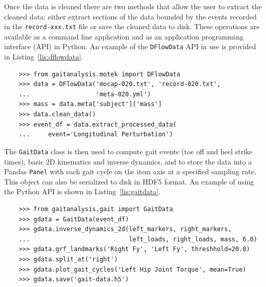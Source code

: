 \documentclass[fleqn,12pt]{wlpeerj}
\begin{document}
Once the data is cleaned there are two methods that allow the user to extract
the cleaned data: either extract sections of the data bounded by the events
recorded in the \verb|record-xxx.txt| file or save the cleaned data to disk.
These operations are available as a command line application and as an
application programming interface (API) in Python. An example of the
\verb|DFlowData| API in use is provided in Listing~\ref{lis:dflowdata}.
%
\begin{listing}
  \begin{verbatim}
    >>> from gaitanalysis.motek import DFlowData
    >>> data = DFlowData('mocap-020.txt', 'record-020.txt',
    ...                  'meta-020.yml')
    >>> mass = data.meta['subject']['mass']
    >>> data.clean_data()
    >>> event_df = data.extract_processed_data(
    ...     event='Longitudinal Perturbation')
  \end{verbatim}
  \cprotect\caption{Python interpreter session showing how one could load a
    trial into memory, extract the subject's mass from the meta data, run the
    data cleaning process, and finally extract a Pandas \verb|DataFrame|
    containing all of the time histories for a specific event in the trial.}
  \label{lis:dflowdata}
\end{listing}

The \verb|GaitData| class is then used to compute gait events (toe off and heel
strike times), basic 2D kinematics and inverse dynamics, and to store the data
into a Pandas \verb|Panel| with each gait cycle on the item axis at a specified
sampling rate. This object can also be serialized to disk in HDF5 format. An
example of using the Python API is shown in Listing~\ref{lis:gaitdata}.
%
\begin{listing}
  \begin{verbatim}
    >>> from gaitanalysis.gait import GaitData
    >>> gdata = GaitData(event_df)
    >>> gdata.inverse_dynamics_2d(left_markers, right_markers,
    ...                           left_loads, right_loads, mass, 6.0)
    >>> gdata.grf_landmarks('Right Fy', 'Left Fy', threshhold=20.0)
    >>> gdata.split_at('right')
    >>> gdata.plot_gait_cycles('Left Hip Joint Torque', mean=True)
    >>> gdata.save('gait-data.h5')
  \end{verbatim}
  \cprotect\caption{Python interpreter session showing how one could use the
    \verb|GaitData| class to load in the result of \verb|DFlowData| and compute
    the inverse dynamics (joint angles and torques), identify the gait events
    (e.g. heel strikes), split the data with respect to the gait events into a
    Pandas \verb|Panel|, plot the mean and standard deviation of one time
    history with respect to the gait cycles, and save the data to disk.}
  \label{lis:gaitdata}
\end{listing}
\end{document}
